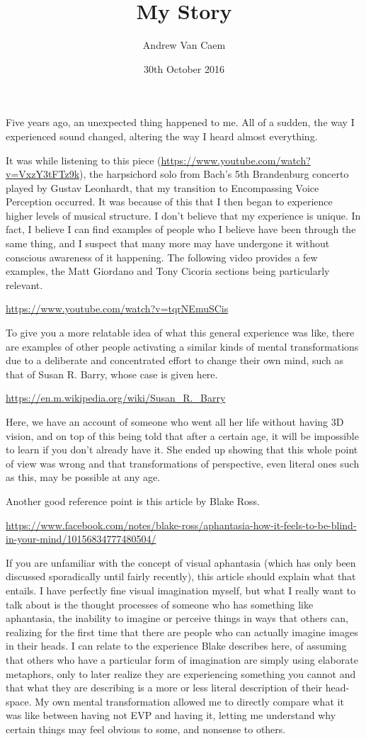 \documentclass[]{article}
\title{My Story}
\author{Andrew Van Caem}
\date{30th October 2016}
\begin{document}
	
\section{}

Five years ago, an unexpected thing happened to me. All of a sudden, the way I experienced sound changed, altering the way I heard almost everything.

It was while listening to this piece (\url{https://www.youtube.com/watch?v=VxzY3tFTz9k}), the harpsichord solo from Bach's 5th Brandenburg concerto played by Gustav Leonhardt, that my transition to Encompassing Voice Perception occurred. It was because of this that I then began to experience higher levels of musical structure. I don't believe that my experience is unique. In fact, I believe I can find examples of people who I believe have been through the same thing, and I suspect that many more may have undergone it without conscious awareness of it happening. The following video provides a few examples, the Matt Giordano and Tony Cicoria sections being particularly relevant.

\url{https://www.youtube.com/watch?v=tqrNEmuSCis}


To give you a more relatable idea of what this general experience was like, there are examples of other people activating a similar kinds of mental transformations due to a deliberate and concentrated effort to change their own mind, such as that of Susan R. Barry, whose case is given here.

\url{https://en.m.wikipedia.org/wiki/Susan_R._Barry}

Here, we have an account of someone who went all her life without having 3D vision, and on top of this being told that after a certain age, it will be impossible to learn if you don't already have it. She ended up showing that this whole point of view was wrong and that transformations of perspective, even literal ones such as this, may be possible at any age.


Another good reference point is this article by Blake Ross.

\url{https://www.facebook.com/notes/blake-ross/aphantasia-how-it-feels-to-be-blind-in-your-mind/10156834777480504/}

If you are unfamiliar with the concept of visual aphantasia (which has only been discussed sporadically until fairly recently), this article should explain what that entails. I have perfectly fine visual imagination myself, but what I really want to talk about is the thought processes of someone who has something like aphantasia, the inability to imagine or perceive things in ways that others can, realizing for the first time that there are people who can actually imagine images in their heads. I can relate to the experience Blake describes here, of assuming that others who have a particular form of imagination are simply using elaborate metaphors, only to later realize they are experiencing something you cannot and that what they are describing is a more or less literal description of their head-space. My own mental transformation allowed me to directly compare what it was like between having not EVP and having it, letting me understand why certain things may feel obvious to some, and nonsense to others.
\end{document}
